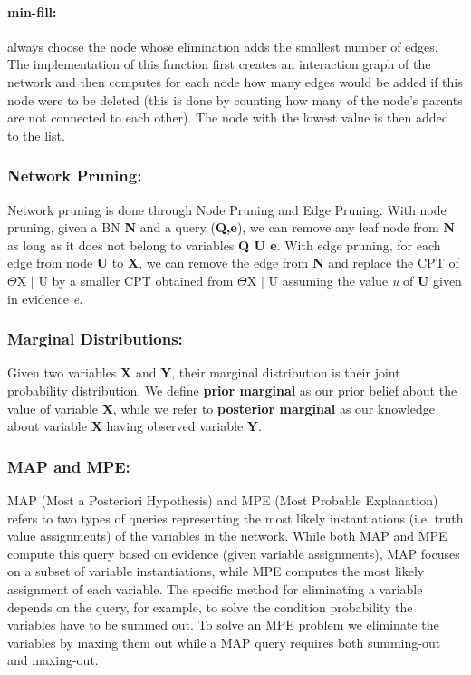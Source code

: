 \paragraph{min-fill:} always choose the node whose elimination adds the smallest number of edges. The implementation of this function first creates an interaction graph of the network and then computes for each node how many edges would be added if this node were to be deleted (this is done by counting how many of the node's parents are not connected to each other). The node with the lowest value is then added to the list.

\subsubsection{Network Pruning:} Network pruning is done through Node Pruning and Edge Pruning. With node pruning, given a BN \textbf{N} and a query (\textbf{Q,e}), we can remove any leaf node from \textbf{N} as long as it does not belong to variables \textbf{Q U e}. With edge pruning, for each edge from node \textbf{U} to \textbf{X}, we can remove the edge from \textbf{N} and replace the CPT of $\Theta$X $\mid$ U by a smaller CPT obtained from  $\Theta$X $\mid$ U assuming the value \textit{u} of \textbf{U} given in evidence \textit{e}.

\subsubsection{Marginal Distributions:} Given two variables \textbf{X} and \textbf{Y}, their marginal distribution is their joint probability distribution. We define \textbf{prior marginal} as our prior belief about the value of variable \textbf{X}, while we refer to \textbf{posterior marginal} as our knowledge about variable \textbf{X} having observed variable \textbf{Y}. 

\subsubsection{MAP and MPE:} MAP (Most a Posteriori Hypothesis) and MPE (Most Probable Explanation) refers to two types of queries representing the most likely instantiations (i.e. truth value assignments) of the variables in the network. 
While both MAP and MPE compute this query based on evidence (given variable assignments), MAP focuses on a subset of variable instantiations, while MPE computes the most likely assignment of each variable.
The specific method for eliminating a variable depends on the query, for example, to solve the condition probability the variables have to be summed out. To solve an MPE problem we eliminate the variables by maxing them out while a MAP query requires both summing-out and maxing-out.   









